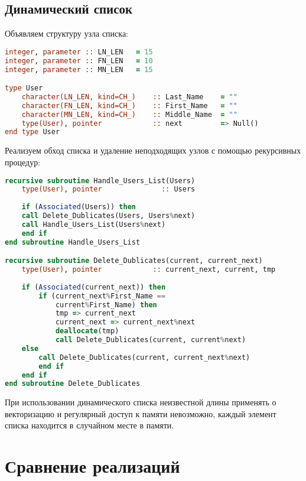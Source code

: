 \documentclass[a4paper,12pt]{article}
\begin{document}
\subsection{Динамический список}

Объявляем структуру узла списка:
\begin{lstlisting}[language=Fortran]
integer, parameter :: LN_LEN   = 15
integer, parameter :: FN_LEN   = 10
integer, parameter :: MN_LEN   = 15

type User
	character(LN_LEN, kind=CH_)    :: Last_Name    = ""
	character(FN_LEN, kind=CH_)    :: First_Name   = ""
	character(MN_LEN, kind=CH_)    :: Middle_Name  = ""
	type(User), pointer            :: next         => Null()
end type User
\end{lstlisting}

Реализуем обход списка и удаление неподходящих узлов с помощью рекурсивных процедур:
\begin{lstlisting}[language=Fortran]
recursive subroutine Handle_Users_List(Users)
	type(User), pointer              :: Users
	
	if (Associated(Users)) then
	call Delete_Dublicates(Users, Users%next)
	call Handle_Users_List(Users%next)
	end if
end subroutine Handle_Users_List

recursive subroutine Delete_Dublicates(current, current_next)
	type(User), pointer            :: current_next, current, tmp
	
	if (Associated(current_next)) then
		if (current_next%First_Name == 
			current%First_Name) then
			tmp => current_next
			current_next => current_next%next
			deallocate(tmp)
			call Delete_Dublicates(current, current%next)
	else
		call Delete_Dublicates(current, current_next%next)
		end if
	end if
end subroutine Delete_Dublicates
\end{lstlisting}

При использовании динамического списка неизвестной длины применять о векторизацию и регулярный доступ к памяти невозможно, каждый элемент списка находится в случайном месте в памяти.
\newpage
\section{Сравнение реализаций}
\end{document}
